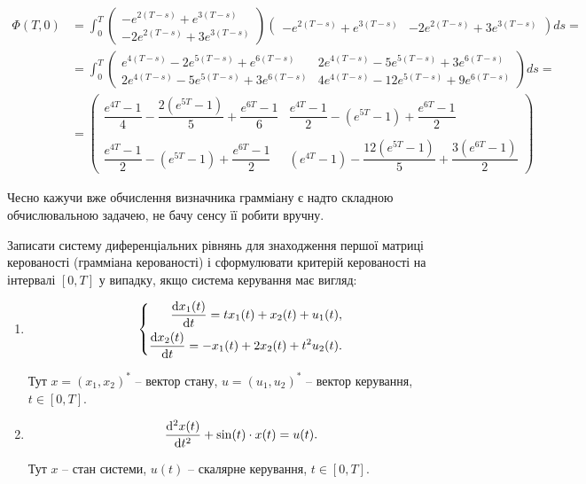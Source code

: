 \begin{solution}
    \begin{align*} 
        \Phi(T, 0) &= \int_0^T \begin{pmatrix} -e^{2(T - s)} + e^{3(T - s)} \\ -2e^{2(T - s)} + 3e^{3(T - s)} \end{pmatrix} \begin{pmatrix} -e^{2(T - s)} + e^{3(T - s)} & -2e^{2(T - s)} + 3e^{3(T - s)} \end{pmatrix} ds = \\
        &= \int_0^T \begin{pmatrix} e^{4(T - s)} - 2 e^{5(T - s)} + e^{6(T - s)} & 2 e^{4(T - s)} - 5 e^{5(T - s)} + 3 e^{6(T - s)} \\ 2e^{4(T - s)} - 5 e^{5(T - s)} + 3 e^{6(T - s)} & 4 e^{4(T - s)} - 12 e^{5(T - s)} + 9  e^{6(T - s)} \end{pmatrix} ds = \\
        &= \begin{pmatrix} \dfrac{e^{4T} - 1}{4} - \dfrac{2(e^{5T} - 1)}{5} + \dfrac{e^{6T} - 1}{6} & \dfrac{e^{4T} - 1}{2} - (e^{5T} - 1) + \dfrac{e^{6T} - 1}{2} \\ \\ \dfrac{e^{4T} - 1}{2} - (e^{5T} - 1) + \dfrac{e^{6T} - 1}{2} & (e^{4T} - 1) - \dfrac{12(e^{5T} - 1)}{5} + \dfrac{3(e^{6T} - 1)}{2} \end{pmatrix}
    \end{align*}
    
    Чесно кажучи вже обчислення визначника грамміану є надто складною обчислювальною задачею, не бачу сенсу її робити вручну.
\end{solution}

\begin{problem}
	Записати систему диференціальних рівнянь для знаходження першої матриці керованості (грамміана керованості) і сформулювати критерій керованості на інтервалі $[0, T]$ у випадку, якщо система керування має вигляд:
	\begin{enumerate}
		\item \[ 
		\left\{
			\begin{aligned}
				\frac{\mathop{}\!\mathrm{d} x_1(t)}{\mathop{}\!\mathrm{d} t} = t x_1 (t) + x_2 (t) + u_1 (t), \\
				\frac{\mathop{}\!\mathrm{d} x_2(t)}{\mathop{}\!\mathrm{d} t} = - x_1 (t) + 2 x_2 (t) + t^2 u_2 (t).
			\end{aligned}
		\right.
		\]

		Тут $x = (x_1, x_2)^*$ -- вектор стану, $u = (u_1, u_2)^*$ -- вектор керування, $t \in [0, T]$.

		\item \[ \frac{\mathop{}\!\mathrm{d}^2 x(t)}{\mathop{}\!\mathrm{d} t^2} + \sin(t) \cdot x(t) = u(t). \]

		Тут $x$ -- стан системи, $u(t)$ -- скалярне керування, $t \in [0, T]$.
	\end{enumerate}
\end{problem}

